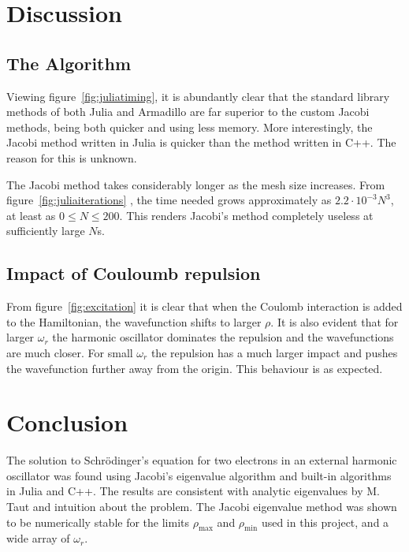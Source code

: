 \documentclass[aps,reprint]{revtex4-1}
\newcommand\blankpage{%
  \null
  \thispagestyle{empty}%
  \addtocounter{page}{-1}%
  \newpage}
\begin{document}
\section{Discussion}

\subsection{The Algorithm}
Viewing figure~\ref{fig:juliatiming}, it is abundantly clear that the standard
library methods of both Julia and Armadillo are far superior to the custom
Jacobi methods, being both quicker and using less memory. More interestingly,
the Jacobi method written in Julia is quicker than the method written in C++.
The reason for this is unknown.

The Jacobi method takes considerably longer as the mesh size increases. From
figure~\ref{fig:juliaiterations} , the time needed grows approximately as
\(2.2\cdot 10^{-3}N^{3}\), at least as \(0\leq N \leq 200\). This renders
Jacobi's method completely useless at sufficiently large \(N\)s.

\subsection{Impact of Couloumb repulsion}
From figure~\ref{fig:excitation} it is clear that when the Coulomb interaction is added to the
Hamiltonian, the wavefunction shifts to larger $\rho$.
It is also evident that for larger $\omega_r$ the harmonic oscillator dominates the repulsion
and the wavefunctions are much closer. For small $\omega_r$ the repulsion
has a much larger impact and pushes the wavefunction further away from the origin.
This behaviour is as expected.
\label{sec:discussion}
\section{Conclusion}
The solution to Schrödinger's equation for two electrons in an external
harmonic oscillator was found using Jacobi's eigenvalue algorithm and built-in
algorithms in Julia and C++. The results are consistent with analytic eigenvalues
by M. Taut and intuition about the problem. The Jacobi eigenvalue method was shown
to be
numerically stable for the limits $\rho_\text{max}$ and $\rho_\text{min}$ used
in this project, and a wide array of $\omega_r$.
\label{sec:conclusion}

\blankpage
\appendix
\end{document}
